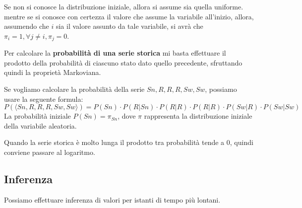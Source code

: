 Se non si conosce la distribuzione iniziale, allora si assume sia quella uniforme.
mentre se si conosce con certezza il valore che assume la variabile all'inizio,
allora, assumendo che $i$ sia il valore assunto da tale variabile, si avrà che
$\pi_i = 1, \forall j \neq i, \pi_j=0$.

Per calcolare la \textbf{probabilità di una serie storica} mi basta effettuare
il prodotto della probabilità di ciascuno stato dato quello precedente, sfruttando
quindi la proprietà Markoviana.
\begin{esempio}
    Se vogliamo calcolare la probabilità della serie $Sn, R,R,R,Sw,Sw$, possiamo
    usare la seguente formula:
    \begin{equation*}
        P(\langle Sn, R,R,R,Sw,Sw \rangle) = P(Sn) \cdot P(R|Sn) \cdot P(R|R)
        \cdot P(R|R)\cdot P(Sw|R) \cdot P(Sw|Sw)
    \end{equation*}
    La probabilità iniziale $P(Sn) = \pi_{Sn}$, dove $\pi$ rappresenta la 
    distribuzione iniziale della variabile aleatoria.
\end{esempio}
Quando la serie storica è molto lunga il prodotto tra probabilità tende a $0$,
quindi conviene passare al logaritmo.
\subsection{Inferenza}
Possiamo effettuare inferenza di valori per istanti di tempo più lontani.

